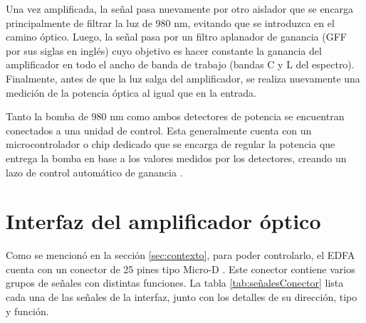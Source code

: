 
Una vez amplificada, la señal pasa nuevamente por otro aislador que se encarga principalmente de filtrar la luz de 980 nm, evitando que se introduzca en el camino óptico. Luego, la señal pasa por un filtro aplanador de ganancia (GFF por sus siglas en inglés) cuyo objetivo es hacer constante la ganancia del amplificador en todo el ancho de banda de trabajo \citep{WEBSITE:EDFA3} (bandas C y L del espectro). Finalmente, antes de que la luz salga del amplificador, se realiza nuevamente una medición de la potencia óptica al igual que en la entrada.

Tanto la bomba de 980 nm como ambos detectores de potencia se encuentran conectados a una unidad de control. Esta generalmente cuenta con un microcontrolador o chip dedicado que se encarga de regular la potencia que entrega la bomba en base a los valores medidos por los detectores, creando un lazo de control automático de ganancia \citep{WEBSITE:EDFA2}\citep{WEBSITE:EDFA1}.

\section{Interfaz del amplificador óptico}
\label{sec:intAmp}

Como se mencionó en la sección \ref{sec:contexto}, para poder controlarlo, el EDFA cuenta con un conector de 25 pines tipo Micro-D \citep{WEBSITE:MICROD_DS}. Este conector contiene varios grupos de señales con distintas funciones. La tabla \ref{tab:señalesConector} lista cada una de las señales de la interfaz, junto con los detalles de su dirección, tipo y función.

